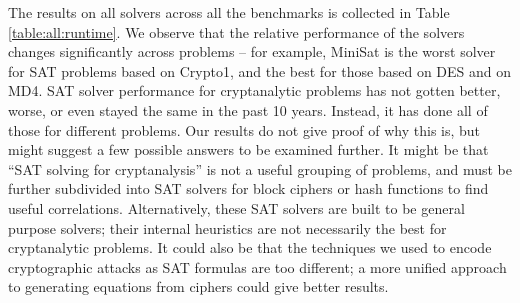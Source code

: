 The results on all solvers across all the benchmarks is collected in Table \ref{table:all:runtime}. We observe that the relative performance of the solvers changes significantly across problems -- for example, MiniSat is the worst solver for SAT problems based on Crypto1, and the best for those based on DES and on MD4. SAT solver performance for cryptanalytic problems has not gotten better, worse, or even stayed the same in the past 10 years. Instead, it has done all of those for different problems. Our results do not give proof of why this is, but might suggest a few possible answers to be examined further. It might be that ``SAT solving for cryptanalysis'' is not a useful grouping of problems, and must be further subdivided into SAT solvers for block ciphers or hash functions to find useful correlations. Alternatively, these SAT solvers are built to be general purpose solvers; their internal heuristics are not necessarily the best for cryptanalytic problems. It could also be that the techniques we used to encode cryptographic attacks as SAT formulas are too different; a more unified approach to generating equations from ciphers could give better results.